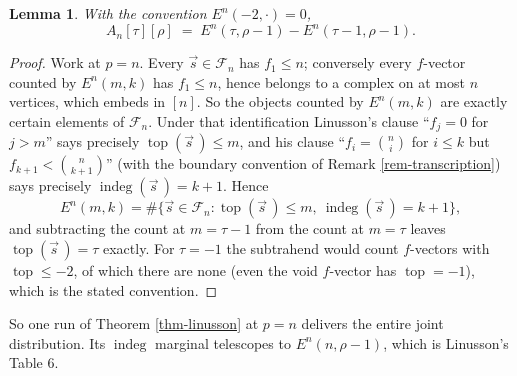 \documentclass[11pt, a4paper, abstract=yes]{scrartcl}
\theoremstyle{definition}
\theoremstyle{remark}
\theoremstyle{plain}
\newtheorem{lemma}[definition]{Lemma}
\newcommand{\indeg}{\operatorname{indeg}}
\newcommand{\tp}{\operatorname{top}}
\begin{document}
\begin{lemma}
With the convention \(E^n(-2,\cdot)=0\),
\begin{equation}\label{eq:auto-12}
  A_n[\tau][\rho]\;=\;E^n(\tau,\rho-1)-E^n(\tau-1,\rho-1).
\end{equation}
\label{lem-joint}
\end{lemma}

\begin{proof}
Work at \(p=n\). Every \(\vec s\in\mathcal F_n\) has \(f_1\le n\); conversely every \(f\)-vector counted by
\(E^n(m,k)\) has \(f_1\le n\), hence belongs to a complex on at most \(n\) vertices, which embeds in
\([n]\). So the objects counted by \(E^n(m,k)\) are exactly certain elements of \(\mathcal F_n\).
Under that identification Linusson's clause ``\(f_j=0\) for \(j>m\)'' says precisely \(\tp(\vec s\,)\le m\),
and his clause ``\(f_i=\binom ni\) for \(i\le k\) but \(f_{k+1}<\binom n{k+1}\)'' (with the boundary
convention of Remark \ref{rem-transcription}) says precisely \(\indeg(\vec s\,)=k+1\). Hence
\[
  E^n(m,k)=\#\lbrace \vec s\in\mathcal F_n:\tp(\vec s\,)\le m,\ \indeg(\vec s\,)=k+1\rbrace ,
\]
and subtracting the count at \(m=\tau-1\) from the count at \(m=\tau\) leaves \(\tp(\vec s\,)=\tau\)
exactly. For \(\tau=-1\) the subtrahend would count \(f\)-vectors with \(\tp\le-2\), of which there
are none (even the void \(f\)-vector has \(\tp=-1\)), which is the stated convention.
\end{proof}

So one run of Theorem \ref{thm-linusson} at \(p=n\) delivers the entire joint distribution. Its
\(\indeg\) marginal telescopes to \(E^n(n,\rho-1)\), which is Linusson's Table 6.
\end{document}
